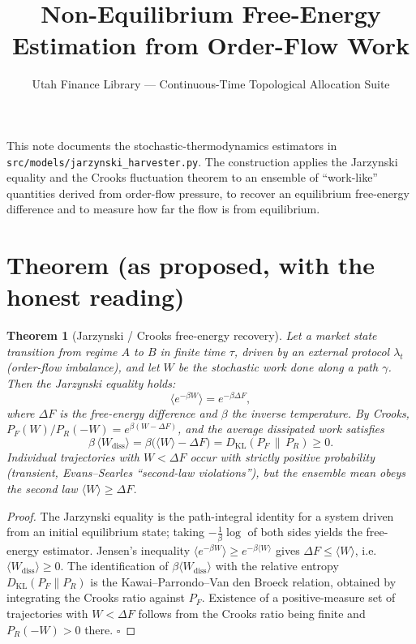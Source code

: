 \documentclass[11pt]{article}
\title{Non-Equilibrium Free-Energy Estimation from Order-Flow Work}
\author{Utah Finance Library --- Continuous-Time Topological Allocation Suite}
\date{}
\newtheorem{theorem}{Theorem}
\begin{document}
\maketitle

\noindent
This note documents the stochastic-thermodynamics estimators in
\texttt{src/models/jarzynski\_harvester.py}. The construction applies the
Jarzynski equality and the Crooks fluctuation theorem to an ensemble of
``work-like'' quantities derived from order-flow pressure, to recover an
equilibrium free-energy difference and to measure how far the flow is from
equilibrium.

\section*{Theorem (as proposed, with the honest reading)}

\begin{theorem}[Jarzynski / Crooks free-energy recovery]
Let a market state transition from regime $A$ to $B$ in finite time $\tau$,
driven by an external protocol $\lambda_t$ (order-flow imbalance), and let $W$ be
the stochastic work done along a path $\gamma$. Then the Jarzynski equality holds:
\begin{equation}
\langle e^{-\beta W} \rangle = e^{-\beta \Delta F},
\end{equation}
where $\Delta F$ is the free-energy difference and $\beta$ the inverse
temperature. By Crooks, $P_F(W)/P_R(-W) = e^{\beta(W-\Delta F)}$, and the average
dissipated work satisfies
\begin{equation}
\beta\,\langle W_{\mathrm{diss}}\rangle
= \beta\big(\langle W\rangle - \Delta F\big)
= D_{\mathrm{KL}}\!\left(P_F \,\|\, P_R\right) \ge 0 .
\end{equation}
Individual trajectories with $W < \Delta F$ occur with strictly positive
probability (transient, Evans--Searles ``second-law violations''), but the
ensemble mean obeys the second law $\langle W\rangle \ge \Delta F$.
\end{theorem}

\begin{proof}
The Jarzynski equality is the path-integral identity for a system driven from an
initial equilibrium state; taking $-\tfrac1\beta\log$ of both sides yields the
free-energy estimator. Jensen's inequality
$\langle e^{-\beta W}\rangle \ge e^{-\beta\langle W\rangle}$ gives
$\Delta F \le \langle W\rangle$, i.e.\ $\langle W_{\mathrm{diss}}\rangle\ge 0$.
The identification of $\beta\langle W_{\mathrm{diss}}\rangle$ with the relative
entropy $D_{\mathrm{KL}}(P_F\|P_R)$ is the Kawai--Parrondo--Van den Broeck
relation, obtained by integrating the Crooks ratio against $P_F$. Existence of a
positive-measure set of trajectories with $W<\Delta F$ follows from the Crooks
ratio being finite and $P_R(-W)>0$ there. $\square$
\end{proof}
\end{document}
